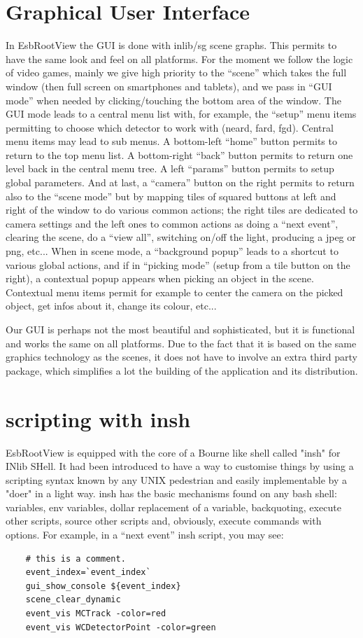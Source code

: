 \documentclass{webofc}
\begin{document}
\section{Graphical User Interface}
In EsbRootView the GUI is done with inlib/sg scene graphs.
This permits to have the same look and feel on all platforms.
For the moment we follow the logic of video games,
mainly we give high priority to the ``scene'' which takes the full
window (then full screen on smartphones and tablets), and we pass in ``GUI
mode'' when needed by clicking/touching the bottom area of the window.
The GUI mode leads to a central menu list with, for example, the
``setup'' menu items permitting to choose which detector to work with
(neard, fard, fgd). Central menu items may lead to sub menus. A bottom-left ``home'' button permits to return to the top
menu list. A bottom-right ``back'' button permits to return one level
back
in the central menu tree. A left ``params'' button permits to setup global
parameters. And at last, a ``camera'' button on the right permits to return
also to the ``scene mode'' but by mapping tiles of squared buttons at
left and right of the window to do various common actions; the right
tiles are dedicated to camera settings and the left ones to common
actions as doing a ``next event'', clearing the scene, do a ``view
all'', switching on/off the light, producing a jpeg or png, etc...
When in scene mode, a ``background popup'' leads 
to a shortcut to various global actions, and if in ``picking mode''
(setup from a tile button on the right), a contextual popup appears when
picking an object in the scene. Contextual menu items permit for
example
to center the camera on the picked object, get infos about it, change its colour, etc...

 Our GUI is perhaps not the most beautiful and sophisticated, but it is functional and works the
 same on all platforms. Due to the fact that it is based on the same
 graphics technology as the scenes, it does not have to involve
 an extra third party package, which simplifies a lot the building
 of the application and its distribution.

\section{scripting with insh}
\label{insh}
 EsbRootView is equipped with the core of a Bourne like shell called
 "insh" for INlib SHell. It had been introduced to have a way to
 customise things by using a scripting syntax known by any UNIX
 pedestrian and easily implementable by a "doer" in a light way. insh has the basic
 mechanisms found on any bash shell: variables, env variables, dollar
 replacement of a variable, backquoting, execute other scripts, source other
 scripts and, obviously, execute commands with options. For example, in
 a ``next event'' insh script, you may see:
\begin{verbatim}
    # this is a comment.
    event_index=`event_index`
    gui_show_console ${event_index}
    scene_clear_dynamic
    event_vis MCTrack -color=red
    event_vis WCDetectorPoint -color=green
\end{verbatim}
 
\end{document}
